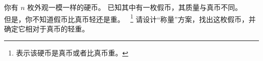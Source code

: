 
\begin{problem}[$n$ 枚硬币]
  你有 $n$ 枚外观一模一样的硬币。
  已知其中有一枚假币，其质量与真币不同。\\
  但是，你不知道假币比真币轻还是重。
  ~\footnote{表示该硬币是真币或者比真币重。} 
  请设计``称量''方案，找出这枚假币，并确定它相对于真币的轻重。
\end{problem}

\begin{solution}
\end{solution}
